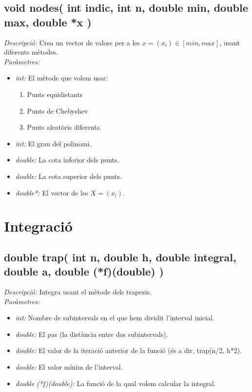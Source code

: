 \documentclass[a4paper,10pt, notitlepage]{article}
\begin{document}
\subsection{void nodes( int indic, int n, double min, double max, double *x )}
\textit{Descripció: }
  Crea un vector de valors per a les $x = (x_i) \in [min, max]$, usant diferents mètodes.
\\\textit{Paràmetres: }\begin{itemize}[label={--}]
  \item \textit{int: } El mètode que volem usar:
  \begin{enumerate}[label=\arabic*.]
      \item Punts equidistants
      \item Punts de Chebyshev
      \item Punts aleatòris diferents.
  \end{enumerate}
  \item \textit{int: } El grau del polinomi.
  \item \textit{double: } La cota inferior dels punts.
  \item \textit{double: } La cota superior dels punts.
  \item \textit{double*: } El vector de les $X = (x_i)$.
\end{itemize}

\section{Integració}

\subsection{double trap( int n, double h, double integral, double a, double (*f)(double) )}
\textit{Descripció: }
  Integra usant el mètode dels trapezis.
\\\textit{Paràmetres: }\begin{itemize}[label={--}]
  \item \textit{int: } Nombre de subintervals en el que hem dividit l'interval inicial.
  \item \textit{double: } El pas (la distància entre dos subintervals).
  \item \textit{double: } El valor de la iteració anterior de la funció (és a dir, trap(n/2, h*2).
  \item \textit{double: } El valor mínim de l'interval.
  \item \textit{double (*f)(double): } La funció de la qual volem calcular la integral.
\end{itemize}
\end{document}
